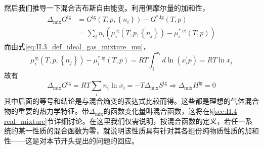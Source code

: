 \documentclass[main.tex]{subfiles}
\begin{document}
然后我们推导一下混合吉布斯自由能变。利用偏摩尔量的加和性，
\begin{align*}
  \Delta_\text{mix}G^\text{ig} & =G^\text{ig}\left(T,p,\left\{n_i\right\}\right)-G^\text{*,ig}\left(T,p\right)                               \\
                               & =\sum_in_i\left(\mu_i^\text{ig}\left(T,p,\left\{n_j\right\}\right)-\mu_i^\text{*,ig}\left(T,p\right)\right)
\end{align*}
而由式\eqref{eq:II.3_def_ideal_gas_mixture_mu}，
\[\mu_i^\text{ig}\left(T,p,\left\{n_j\right\}\right)-\mu_i^\text{*,ig}\left(T,p\right)=RT\int_{1}^{x_i}d\ln\left(x_i^\prime p\right)=RT\ln x_i\]
故有
\[\Delta_\text{mix}G^\text{ig}=RT\sum_in_i\ln x_i=-T\Delta_\text{mix}S^\text{ig}\Rightarrow\Delta_\text{mix}H^\text{ig}=0\]
其中后面的等号和结论是与混合熵变的表达式比较而得。这些都是理想的气体混合物的重要的热力学特征。带$\Delta_\text{mix}$的函数变化量叫混合函数，这将在\S\ref{sec:II.4 real_mixture}节详细讨论。在这里我们仅需说明，按混合函数的定义，若任一系统的某一性质的混合函数为零，就说明该性质具有针对其各组份纯物质性质的加和性——这是对本节开头提出的问题的回应。
\end{document}
